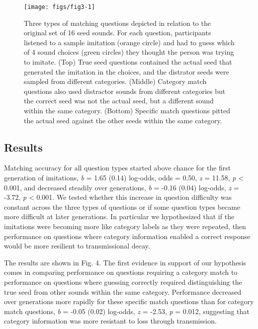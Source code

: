 \documentclass[10pt,letterpaper]{article}
\begin{document}
\begin{figure}

{\centering \texttt{[image: figs/fig3-1]} 

}

\caption{Three types of matching questions depicted in relation to the original set of 16 seed sounds. For each question, participants listened to a sample imitation (orange circle) and had to guess which of 4 sound choices (green circles) they thought the person was trying to imitate. (Top) True seed questions contained the actual seed that generated the imitation in the choices, and the distrator seeds were sampled from different categories. (Middle) Category match questions also used distractor sounds from different categories but the correct seed was not the actual seed, but a different sound within the same category. (Bottom) Specific match questions pitted the actual seed against the other seeds within the same category.}\label{fig:fig3}
\end{figure}

\subsection{Results}\label{results-1}

Matching accuracy for all question types started above chance for the
first generation of imitations, \emph{b} = 1.65 (0.14) log-odds, odds =
0.50, \emph{z} = 11.58, \emph{p} \textless{} 0.001, and decreased
steadily over generations, \emph{b} = -0.16 (0.04) log-odds, \emph{z} =
-3.72, \emph{p} \textless{} 0.001. We tested whether this increase in
question difficulty was constant across the three types of questions or
if some question types became more difficult at later generations. In
particular we hypothesized that if the imitations were becoming more
like category labels as they were repeated, then performance on
questions where category information enabled a correct response would be
more resilient to transmissional decay.

The results are shown in Fig. 4. The first evidence in support of our
hypothesis comes in comparing performance on questions requiring a
category match to performance on questions where guessing correctly
required distinguishing the true seed from other sounds within the same
category. Performance decreased over generations more rapidly for these
specific match questions than for category match questions, \emph{b} =
-0.05 (0.02) log-odds, \emph{z} = -2.53, \emph{p} = 0.012, suggesting
that category information was more resistant to loss through
transmission.
\end{document}
